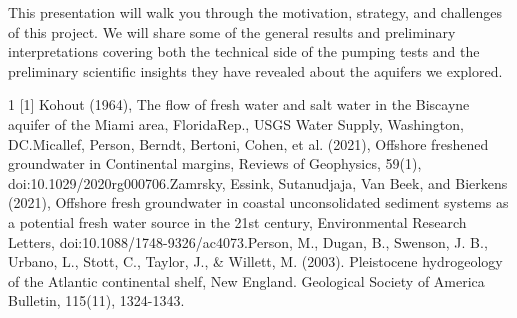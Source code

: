 \begin{conf-abstract}
{This presentation will walk you through the motivation, strategy, and challenges of this project. We will share some of the general results and preliminary interpretations covering both the technical side of the pumping tests and the preliminary scientific insights they have revealed about the aquifers we explored.

{\scriptsize
\begin{spacing}{1}
[1] Kohout (1964), The flow of fresh water and salt water in the Biscayne aquifer of the Miami area, FloridaRep., USGS Water Supply, Washington, DC.\newline
[2] Micallef, Person, Berndt, Bertoni, Cohen, et al. (2021), Offshore freshened groundwater in Continental margins, Reviews of Geophysics, 59(1), doi:10.1029/2020rg000706.\newline
[3] Zamrsky, Essink, Sutanudjaja, Van Beek, and Bierkens (2021), Offshore fresh groundwater in coastal unconsolidated sediment systems as a potential fresh water source in the 21st century, Environmental Research Letters, doi:10.1088/1748-9326/ac4073.\newline
[4] Person, M., Dugan, B., Swenson, J. B., Urbano, L., Stott, C., Taylor, J., \& Willett, M. (2003). Pleistocene hydrogeology of the Atlantic continental shelf, New England. Geological Society of America Bulletin, 115(11), 1324-1343.
\end{spacing}
}

}
\end{conf-abstract}
